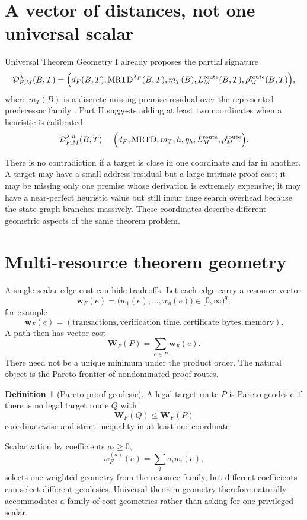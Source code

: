 \documentclass[11pt]{article}
\theoremstyle{definition}
\newtheorem{definition}[theorem]{Definition}
\theoremstyle{remark}
\newcommand{\MRTD}{\operatorname{MRTD}}
\newcommand{\route}{\mathrm{route}}
\begin{document}
\section{A vector of distances, not one universal scalar}

Universal Theorem Geometry I already proposes the partial signature
\[
\mathcal D^{\lambda}_{F,M}(B,T)
=
\Bigl(
 d_F(B,T),
 \MRTD^{\lambda_F}(B,T),
 m_T(B),
 L_M^{\route}(B,T),
 \rho_M^{\route}(B,T)
\Bigr),
\]
where $m_T(B)$ is a discrete missing-premise residual over the represented predecessor family \cite{UTGI}. Part II suggests adding at least two coordinates when a heuristic is calibrated:
\[
\mathcal D^{\lambda,h}_{F,M}(B,T)
=
\Bigl(
 d_F,
 \MRTD,
 m_T,
 h,
 \eta_h,
 L_M^{\route},
 \rho_M^{\route}
\Bigr).
\]

There is no contradiction if a target is close in one coordinate and far in another. A target may have a small address residual but a large intrinsic proof cost; it may be missing only one premise whose derivation is extremely expensive; it may have a near-perfect heuristic value but still incur huge search overhead because the state graph branches massively. These coordinates describe different geometric aspects of the same theorem problem.

\section{Multi-resource theorem geometry}

A single scalar edge cost can hide tradeoffs. Let each edge carry a resource vector
\[
\mathbf w_F(e)
=
\bigl(w_1(e),\dots,w_q(e)\bigr)\in[0,\infty)^q,
\]
for example
\[
\mathbf w_F(e)=
(\text{transactions},\text{verification time},\text{certificate bytes},\text{memory}).
\]
A path then has vector cost
\[
\mathbf W_F(P)=\sum_{e\in P}\mathbf w_F(e).
\]
There need not be a unique minimum under the product order. The natural object is the Pareto frontier of nondominated proof routes.

\begin{definition}[Pareto proof geodesic]
A legal target route $P$ is Pareto-geodesic if there is no legal target route $Q$ with
\[
\mathbf W_F(Q)\le \mathbf W_F(P)
\]
coordinatewise and strict inequality in at least one coordinate.
\end{definition}

Scalarization by coefficients $a_i\ge0$,
\[
w^{(a)}_F(e)=\sum_i a_iw_i(e),
\]
selects one weighted geometry from the resource family, but different coefficients can select different geodesics. Universal theorem geometry therefore naturally accommodates a family of cost geometries rather than asking for one privileged scalar.
\end{document}
